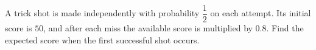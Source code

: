 A trick shot is made independently with probability $\dfrac{1}{2}$ on each attempt. Its initial score is $50$, and after each miss the available score is multiplied by $0.8$. Find the expected score when the first successful shot occurs.
